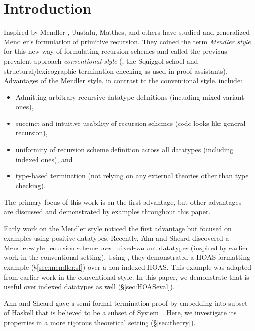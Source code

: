 \section{Introduction}\label{sec:intro}

Inspired by Mendler \cite{Mendler87}, Uustalu, Matthes, and others
\cite{UusVen99,UusVen00,AbeMatUus03,AbeMatUus05,AbeMat04} have studied
and generalized Mendler's formulation of primitive recursion. They coined
the term \emph{Mendler style} for this new way of formulating recursion schemes
and called the previous prevalent approach \emph{conventional style} (\eg,
the Squiggol school and structural/lexicographic termination checking
as used in proof assistants). Advantages of the Mendler style, in contrast to
the conventional style, include:
\begin{itemize}
\item Admitting arbitrary recursive datatype definitions
	(including mixed-variant ones),
\item succinct and intuitive usability of recursion schemes
	(code looks like general recursion),
\item uniformity of recursion scheme definition across all datatypes
	(including indexed ones), and
\item type-based termination
	(not relying on any external theories other than type checking).
\end{itemize}
The primary focus of this work is on the first advantage, but other advantages
are discussed and demonstrated by examples throughout this paper.

Early work \cite{UusVen99,UusVen00,AbeMatUus03,AbeMatUus05,AbeMat04} on
the Mendler style noticed the first advantage but focused on examples
using positive datatypes. Recently, Ahn and Sheard \cite{AhnShe11}
discovered a Mendler-style recursion scheme \msfit{} over mixed-variant
datatypes (inspired by earlier work \cite{MeiHut95,FegShe96,bgb} in
the conventional setting). Using \msfit{}, they demonstrated a HOAS
formatting example (\S\ref{sec:mendler:sf}) over a non-indexed HOAS.
This example was adapted from earlier work \cite{FegShe96,bgb} in
the conventional style. In this paper, we demonstrate that \msfit{} is
useful over indexed datatypes as well (\S\ref{sec:HOASeval}).

Ahn and Sheard \cite{AhnShe11} gave a semi-formal termination proof by
embedding \msfit{} into subset of Haskell that is believed to be a subset of
System~\Fw. Here, we investigate its properties in a more rigorous theoretical
setting (\S\ref{sec:theory}).

